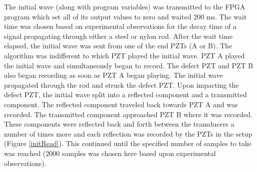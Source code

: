 \documentclass[11pt,letterpaper]{article}%
\begin{document}
The initial wave (along with program variables) was transmitted to the FPGA program which set all of its output values to zero and waited 200 ms. The wait time was chosen based on experimental observations for the decay time of a signal propagating through either a steel or nylon rod. After the wait time elapsed, the initial wave was sent from one of the end PZTs (A or B). The algorithm was indifferent to which PZT played the initial wave. PZT A played the initial wave and simultaneously began to record. The defect PZT and PZT B also began recording as soon as PZT A began playing. The initial wave propagated through the rod and struck the defect PZT. Upon impacting the defect PZT, the initial wave split into a reflected component and a transmitted component. The reflected component traveled back towards PZT A and was recorded. The transmitted component approached PZT B where it was recorded. These components were reflected back and forth between the transducers a number of times more and each reflection was recorded by the PZTs in the setup (Figure \ref{initRead}). This continued until the specified number of samples to take was reached (2000 samples was chosen here based upon experimental observations).
\end{document}
